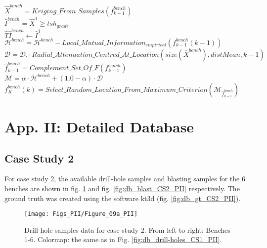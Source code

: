 {\begin{algorithm}[H]
{{{					$\hat{X}^{bench} = Kriging\_From\_Samples(f^{bench}_{k-1})$\\
					$\hat{I}^{bench} = \hat{X}^{1} \geq tsh_{grade}$\\
					$\hat{TI}^{bench} \leftarrow \hat{I}^{1}$\\
				}{
					$\mathcal{H}^{bench} = \mathcal{H}^{bench}  - Local\_Mutual\_Information_{empirical}(f^{bench}_{k-1}(k-1))$ \\
					$\mathcal{D} = \mathcal{D} .\cdot Radial\_Attenuation\_Centred\_At\_Location(size(\bar{X}^{bench}),distMean,k-1)$\\
				}
				$\hat{f}^{bench}_{k-1} = Complement\_Set\_Of\_F(f^{bench}_{k-1})$ \\
				$\mathcal{M} = \alpha \cdot \mathcal{H}^{bench} + (1.0 - \alpha) \cdot  \mathcal{D}$\\
				$ f^{bench}_{K}(k) = Select\_Random\_Location\_From\_Maximum\_Criterion(\mathcal{M}_{\hat{f}^{bench}_{k-1} } ) $
			}
		}	
		\caption{Pseudo code implementing the adaptive framework from rules in (\ref{eq_subsec_ObjectiveFunction_1_PII}). 
		} 
	\end{algorithm}
}

\section{App. II: Detailed Database}
\label{app_databases_PII}

\subsection{Case Study 2}
For case study 2, the available drill-hole samples and blasting samples for the 6 benches are shown in fig. \ref{fig:db_drill-holes_CS2_PII} and fig. \ref{fig:db_blast_CS2_PII} respectively. The ground truth was created using the software kt3d (fig. \ref{fig:db_gt_CS2_PII}).

\begin{figure}[h!]
	\centering
	\texttt{[image: Figs\_PII/Figure\_09a\_PII]}
	\caption{\label{fig:db_drill-holes_CS2_PII} Drill-hole samples data for case study $2$. From left to right: Benches 1-6. Colormap: the same as in Fig. \ref{fig:db_drill-holes_CS1_PII}.}
\end{figure}


